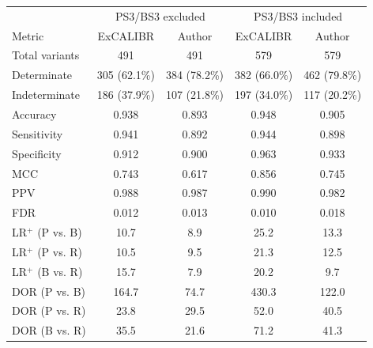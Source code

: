 \begin{tabular}{lcccc}
\toprule
 & \multicolumn{2}{c}{PS3/BS3 excluded} & \multicolumn{2}{c}{PS3/BS3 included} \\
Metric & ExCALIBR & Author & ExCALIBR & Author \\
\midrule
Total variants & 491 & 491 & 579 & 579 \\
Determinate & 305 (62.1\%) & 384 (78.2\%) & 382 (66.0\%) & 462 (79.8\%) \\
Indeterminate & 186 (37.9\%) & 107 (21.8\%) & 197 (34.0\%) & 117 (20.2\%) \\
\midrule
Accuracy & 0.938 & 0.893 & 0.948 & 0.905 \\
Sensitivity & 0.941 & 0.892 & 0.944 & 0.898 \\
Specificity & 0.912 & 0.900 & 0.963 & 0.933 \\
MCC & 0.743 & 0.617 & 0.856 & 0.745 \\
PPV & 0.988 & 0.987 & 0.990 & 0.982 \\
FDR & 0.012 & 0.013 & 0.010 & 0.018 \\
\midrule
LR$^+$ (P vs. B) & 10.7 & 8.9 & 25.2 & 13.3 \\
LR$^+$ (P vs. R) & 10.5 & 9.5 & 21.3 & 12.5 \\
LR$^+$ (B vs. R) & 15.7 & 7.9 & 20.2 & 9.7 \\
DOR (P vs. B) & 164.7 & 74.7 & 430.3 & 122.0 \\
DOR (P vs. R) & 23.8 & 29.5 & 52.0 & 40.5 \\
DOR (B vs. R) & 35.5 & 21.6 & 71.2 & 41.3 \\
\bottomrule
\end{tabular}
